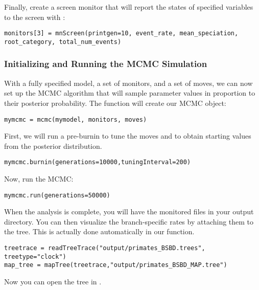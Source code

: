 Finally, create a screen monitor that will report the states of specified variables to the screen with :
{\tt \begin{snugshade*}
\begin{lstlisting}
monitors[3] = mnScreen(printgen=10, event_rate, mean_speciation, root_category, total_num_events)
\end{lstlisting}
\end{snugshade*}}

\subsubsection{Initializing and Running the MCMC Simulation}

With a fully specified model, a set of monitors, and a set of moves, we can now set up the MCMC algorithm that will sample parameter values in proportion to their posterior probability. The  function will create our MCMC object:
{\tt \begin{snugshade*}
\begin{lstlisting}
mymcmc = mcmc(mymodel, monitors, moves)
\end{lstlisting}
\end{snugshade*}}

First, we will run a pre-burnin to tune the moves and to obtain starting values from the posterior distribution.
{\tt \begin{snugshade*}
\begin{lstlisting}
mymcmc.burnin(generations=10000,tuningInterval=200)
\end{lstlisting}
\end{snugshade*}}


Now, run the MCMC:
{\tt \begin{snugshade*}
\begin{lstlisting}
mymcmc.run(generations=50000)
\end{lstlisting}
\end{snugshade*}}

When the analysis is complete, you will have the monitored files in your output directory.
You can then visualize the branch-specific rates by attaching them to the tree.
This is actually done automatically in our  function.
{\tt \begin{snugshade*}
\begin{lstlisting}
treetrace = readTreeTrace("output/primates_BSBD.trees", treetype="clock")
map_tree = mapTree(treetrace,"output/primates_BSBD_MAP.tree")
\end{lstlisting}
\end{snugshade*}}
Now you can open the tree in \FigTree.


